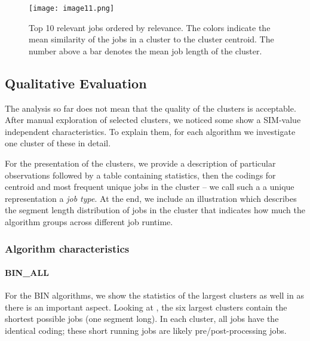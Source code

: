 \documentclass{jhps}
\begin{document}

\begin{figure}
  \centering
   \texttt{[image: image11.png]}
   \caption{Top 10 relevant jobs ordered by relevance.
   The colors indicate the mean similarity of the jobs in a cluster to the cluster centroid.
   The number above a bar denotes the mean job length of the cluster.}
   \label{fig:top10_relevant_jobs}
\end{figure}

\subsection{Qualitative Evaluation}
The analysis so far does not mean that the quality of the clusters is acceptable.
After manual exploration of selected clusters, we noticed some show a SIM-value independent characteristics.
To explain them, for each algorithm we investigate one cluster of these in detail.

For the presentation of the clusters, we provide a description of particular observations followed by a table containing statistics, then the codings for centroid and most frequent unique jobs in the cluster -- we call such a a unique representation a \textit{job type}.
At the end, we include an illustration which describes the segment length distribution of jobs in the cluster that indicates how much the algorithm groups across different job runtime.

\subsubsection{Algorithm characteristics}
\paragraph{BIN\_ALL}
For the BIN algorithms, we show the statistics of the largest clusters as well in  as there is an important aspect.
Looking at , the six largest clusters contain the shortest possible jobs (one segment long).
In each cluster, all jobs have the identical coding; these short running jobs are likely pre/post-processing jobs.
\end{document}
